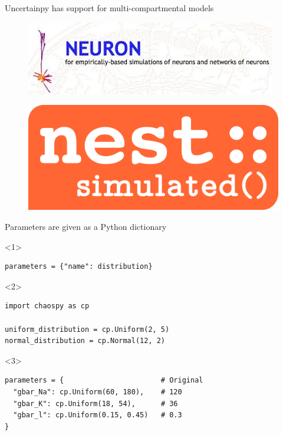 \documentclass[presentation]{beamer}
\begin{document}
\begin{frame}[fragile]{Uncertainpy has support for multi-compartmental models
  }
  \vspace{-2mm}

  \begin{figure}
    \includegraphics[height=0.3\textheight]{neuron.jpeg}
  \end{figure}
  \pause
  \begin{figure}
    \includegraphics[height=0.25\textheight]{nest.png}
  \end{figure}

\end{frame}


\begin{frame}[fragile]{Parameters are given as a Python dictionary}

  \begin{onlyenv}<1>
    \begin{lstlisting}
parameters = {"name": distribution}
    \end{lstlisting}
  \end{onlyenv}

\begin{onlyenv}<2>
    \begin{lstlisting}
import chaospy as cp

uniform_distribution = cp.Uniform(2, 5)
normal_distribution = cp.Normal(12, 2)
    \end{lstlisting}
  \end{onlyenv}

  \begin{onlyenv}<3>
    \begin{lstlisting}
parameters = {                       # Original
  "gbar_Na": cp.Uniform(60, 180),    # 120
  "gbar_K": cp.Uniform(18, 54),      # 36
  "gbar_l": cp.Uniform(0.15, 0.45)   # 0.3
}
\end{lstlisting}
  \end{onlyenv}
\end{frame}
\end{document}

